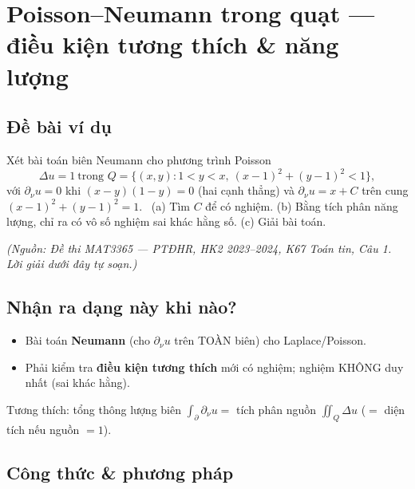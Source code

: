 
\section{Poisson--Neumann trong quạt --- điều kiện tương thích \& năng lượng}

\subsection*{Đề bài ví dụ}
Xét bài toán biên Neumann cho phương trình Poisson
\[
  \Delta u=1\ \text{trong } Q=\{(x,y): 1<y<x,\ (x-1)^2+(y-1)^2<1\},
\]
với $\partial_\nu u=0$ khi $(x-y)(1-y)=0$ (hai cạnh thẳng) và $\partial_\nu u=x+C$ trên cung
$(x-1)^2+(y-1)^2=1$. \ (a) Tìm $C$ để có nghiệm. (b) Bằng tích phân năng lượng, chỉ ra có vô số
nghiệm sai khác hằng số. (c) Giải bài toán.

\emph{\small(Nguồn: Đề thi MAT3365 --- PTĐHR, HK2 2023--2024, K67 Toán tin, Câu 1. Lời giải dưới đây tự soạn.)}

\subsection*{Nhận ra dạng này khi nào?}
\begin{itemize}
  \item Bài toán \textbf{Neumann} (cho $\partial_\nu u$ trên TOÀN biên) cho Laplace/Poisson.
  \item Phải kiểm tra \textbf{điều kiện tương thích} mới có nghiệm; nghiệm KHÔNG duy nhất (sai khác hằng).
\end{itemize}
\begin{meobox}
Tương thích: tổng thông lượng biên $\int_{\partial}\partial_\nu u=$ tích phân nguồn $\iint_Q\Delta u$ ($=$ diện tích nếu nguồn $=1$).
\end{meobox}

\subsection*{Công thức \& phương pháp}
